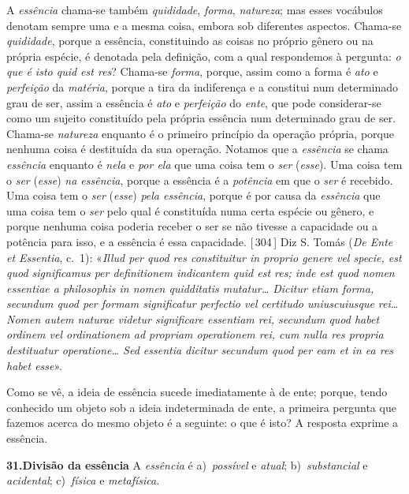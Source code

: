 \documentclass[12pt,a4paper]{article}
\newcommand{\pg}[1]{\thinspace\textup{[\,#1\,]}\thinspace}
\newcommand{\tese}[2]{\bigskip\noindent\textbf{#1.\quad #2}\;\textemdash\;}
\begin{document}
{  A \emph{essência} chama-se também \emph{quididade}, \emph{forma},
  \emph{natureza}; mas esses vocábulos denotam sempre uma e a mesma coisa,
  embora sob diferentes aspectos. \textemdash{} Chama-se \emph{quididade},
  porque a essência, constituindo as coisas no próprio gênero ou na própria
  espécie, é denotada pela definição, com a qual respondemos à pergunta:
  \emph{o que é isto \textemdash{} quid est res}? \textemdash{} Chama-se
  \emph{forma}, porque, assim como a forma é \emph{ato} e \emph{perfeição} da
  \emph{matéria}, porque a tira da indiferença e a constitui num determinado
  grau de ser, assim a essência é \emph{ato} e \emph{perfeição} do \emph{ente},
  que pode considerar-se como um sujeito constituído pela própria essência num
  determinado grau de ser. \textemdash{} Chama-se \emph{natureza} enquanto é o
  primeiro princípio da operação própria, porque nenhuma coisa é destituída da
  sua operação. \textemdash{} Notamos que a \emph{essência} se chama
  \emph{essência} enquanto é \emph{nela} e \emph{por ela} que uma coisa tem o
  \emph{ser} (\emph{esse}). Uma coisa tem o \emph{ser} (\emph{esse})
  \emph{na essência}, porque a essência é a \emph{potência} em que o \emph{ser}
  é recebido. Uma coisa tem o \emph{ser} (\emph{esse}) \emph{pela essência},
  porque é por causa da \emph{essência} que uma coisa tem o \emph{ser} pelo qual
  é constituída numa certa espécie ou gênero, e porque nenhuma coisa poderia
  receber o ser se não tivesse a capacidade ou a potência para isso, e a
  essência é essa capacidade. \pg{304} \textemdash{} Diz S. Tomás
  (\emph{De Ente et Essentia}, c.~1): «\textit{Illud per quod res constituitur
  in proprio genere vel specie, est quod significamus per definitionem
  indicantem quid est res; inde est quod nomen essentiae a philosophis in nomen
  quidditatis mutatur\dots{} Dicitur etiam forma, secundum quod per formam
  significatur perfectio vel certitudo uniuscuiusque rei\dots{} Nomen autem
  naturae videtur significare essentiam rei, secundum quod habet ordinem vel
  ordinationem ad propriam operationem rei, cum nulla res propria destituatur
  operatione\dots{} Sed essentia dicitur secundum quod per eam et in ea res
  habet esse}».

  Como se vê, a ideia de essência sucede imediatamente à de ente; porque, tendo
  conhecido um objeto sob a ideia indeterminada de ente, a primeira pergunta
  que fazemos acerca do mesmo objeto é a seguinte: o que é isto? \textemdash{}
  A resposta exprime a essência.}

\tese{31}{Divisão da essência} A \emph{essência} é \textemdash{} a)~\emph{possível}
e \emph{atual}; \textemdash{} b)~\emph{substancial} e \emph{acidental};
\textemdash{} c)~\emph{física} e \emph{metafísica}.
\end{document}
